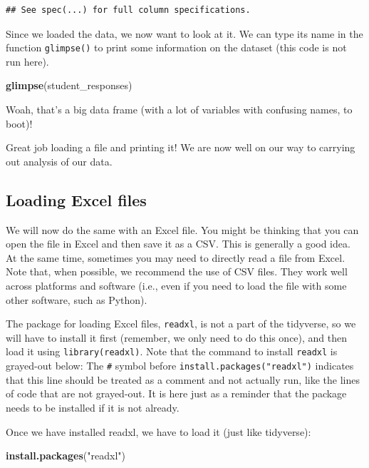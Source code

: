 \documentclass[]{book}
\newenvironment{Shaded}{\begin{snugshade}}{\end{snugshade}}
\newcommand{\KeywordTok}[1]{\textcolor[rgb]{0.13,0.29,0.53}{\textbf{#1}}}
\newcommand{\StringTok}[1]{\textcolor[rgb]{0.31,0.60,0.02}{#1}}
\newcommand{\NormalTok}[1]{#1}
\begin{document}
\begin{verbatim}
## See spec(...) for full column specifications.
\end{verbatim}

Since we loaded the data, we now want to look at it. We can type its
name in the function \texttt{glimpse()} to print some information on the
dataset (this code is not run here).

\begin{Shaded}
\begin{Highlighting}[]
\KeywordTok{glimpse}\NormalTok{(student_responses)}
\end{Highlighting}
\end{Shaded}

Woah, that's a big data frame (with a lot of variables with confusing
names, to boot)!

Great job loading a file and printing it! We are now well on our way to
carrying out analysis of our data.

\subsection{Loading Excel files}\label{loading-excel-files}

We will now do the same with an Excel file. You might be thinking that
you can open the file in Excel and then save it as a CSV. This is
generally a good idea. At the same time, sometimes you may need to
directly read a file from Excel. Note that, when possible, we recommend
the use of CSV files. They work well across platforms and software
(i.e., even if you need to load the file with some other software, such
as Python).

The package for loading Excel files, \texttt{readxl}, is not a part of
the tidyverse, so we will have to install it first (remember, we only
need to do this once), and then load it using \texttt{library(readxl)}.
Note that the command to install \texttt{readxl} is grayed-out below:
The \texttt{\#} symbol before \texttt{install.packages("readxl")}
indicates that this line should be treated as a comment and not actually
run, like the lines of code that are not grayed-out. It is here just as
a reminder that the package needs to be installed if it is not already.

Once we have installed readxl, we have to load it (just like tidyverse):

\begin{Shaded}
\begin{Highlighting}[]
\KeywordTok{install.packages}\NormalTok{(}\StringTok{"readxl"}\NormalTok{)}
\end{Highlighting}
\end{Shaded}
\end{document}
